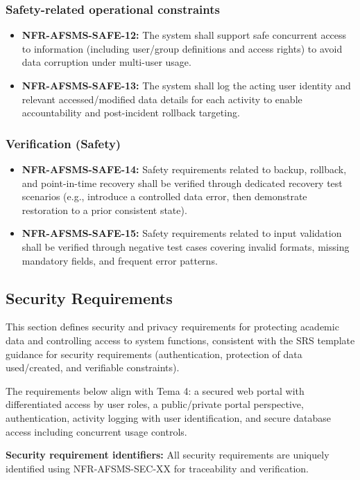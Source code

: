 \documentclass[11pt, a4paper]{article}
\begin{document}
\subsubsection{Safety-related operational constraints}
\begin{itemize}
    \item \textbf{NFR-AFSMS-SAFE-12:} The system shall support safe concurrent access to information (including user/group definitions and access rights) to avoid data corruption under multi-user usage.
    \item \textbf{NFR-AFSMS-SAFE-13:} The system shall log the acting user identity and relevant accessed/modified data details for each activity to enable accountability and post-incident rollback targeting.
\end{itemize}

\subsubsection{Verification (Safety)}
\begin{itemize}
    \item \textbf{NFR-AFSMS-SAFE-14:} Safety requirements related to backup, rollback, and point-in-time recovery shall be verified through dedicated recovery test scenarios (e.g., introduce a controlled data error, then demonstrate restoration to a prior consistent state).
    \item \textbf{NFR-AFSMS-SAFE-15:} Safety requirements related to input validation shall be verified through negative test cases covering invalid formats, missing mandatory fields, and frequent error patterns.
\end{itemize}

\subsection{Security Requirements}
This section defines security and privacy requirements for protecting academic data and controlling access to system functions, consistent with the SRS template guidance for security requirements (authentication, protection of data used/created, and verifiable constraints).

The requirements below align with Tema 4: a secured web portal with differentiated access by user roles, a public/private portal perspective, authentication, activity logging with user identification, and secure database access including concurrent usage controls.

\textbf{Security requirement identifiers:}
All security requirements are uniquely identified using NFR-AFSMS-SEC-XX for traceability and verification.
\end{document}
